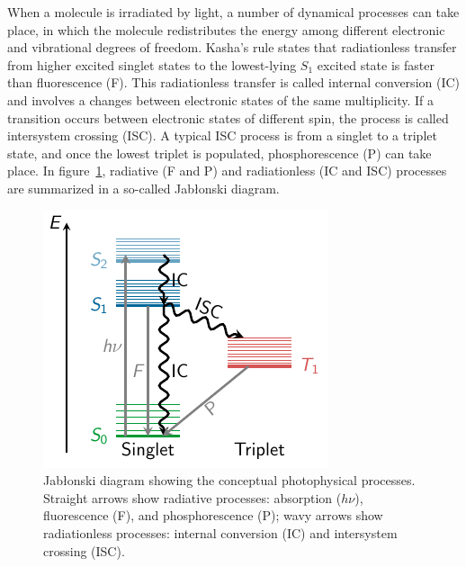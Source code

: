 \documentclass[a4paper,11pt,DIV=15,openany,twoside=false]{scrbook}
\begin{document}
When a molecule is irradiated by light, a number of dynamical processes can take place, in which the molecule redistributes the energy among different electronic and vibrational degrees of freedom. Kasha's rule \cite{Kasha1950DFS} states that radiationless transfer from higher excited singlet states to the lowest-lying $S_1$ excited state is faster than fluorescence (F). This radiationless transfer is called internal conversion (IC) and involves a changes between electronic states of the same multiplicity. If a transition occurs between electronic states of different spin, the process is called intersystem crossing (ISC). A typical ISC process is from a singlet to a triplet state, and once the lowest triplet is populated, phosphorescence (P) can take place. In figure~\ref{fig:jablonski}, radiative (F and P) and radiationless (IC and ISC) processes are summarized in a so-called Jab{\l}onski diagram.

\begin{figure}[h]
  \centering
  \includegraphics[scale=1.6]{img/jablonski/jablonski.pdf}
  \caption{Jab{\l}onski diagram showing the conceptual photophysical processes. Straight arrows show radiative processes: absorption ($h\nu$), fluorescence (F), and phosphorescence (P); wavy arrows show radiationless processes: internal conversion (IC) and intersystem crossing (ISC). }
  \label{fig:jablonski}
\end{figure}
\end{document}
